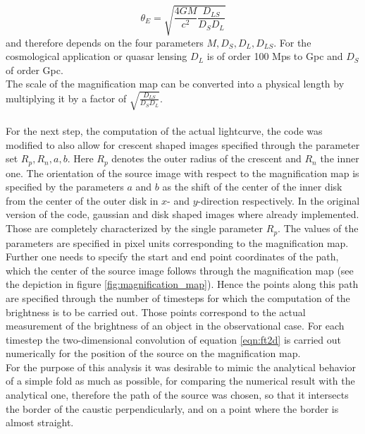 \begin{equation}
\theta_{E}=\sqrt{\frac{4GM}{c^{2}} \frac{D_{LS}}{D_{S}D_{L}}} 
\end{equation}  
and therefore depends on the four parameters $M,D_{S},D_{L},D_{LS}$. For the cosmological application or quasar lensing $D_{L}$ is of order 100 Mps to Gpc and $D_{S}$ of order Gpc.\\   
The scale of the magnification map can be converted into a physical length by multiplying it by a factor of $ \sqrt{\frac{D_{LS}}{D_{S}D_{L}}}$.\\\\
For the next step, the computation of the actual lightcurve, the code was modified to also allow for crescent shaped images specified through the parameter set $R_p,R_n,a,b$. Here $R_p$ denotes the outer radius of the crescent and $R_n$ the inner one. The orientation of the source image with respect to the magnification map is specified by the parameters $a$ and $b$ as the shift of the center of the inner disk from the center of the outer disk in $x$- and $y$-direction respectively. In the original version of the code, gaussian and disk shaped images where already implemented. Those are completely characterized by the single parameter $R_p$. The values of the parameters are specified in pixel units corresponding to the magnification map. Further one needs to specify the start and end point coordinates of the path, which the center of the source image follows through the magnification map (see the depiction in figure \ref{fig:magnification_map}). Hence the points along this path are specified through the number of timesteps for which the computation of the brightness is to be carried out. Those points correspond to the actual measurement of the brightness of an object in the observational case. For each timestep the two-dimensional convolution of equation \ref{eqn:ft2d} is carried out numerically for the position of the source on the magnification map. \\
For the purpose of this analysis it was desirable to mimic the analytical behavior of a simple fold as much as possible, for comparing the numerical result with the analytical one, therefore the path of the source was chosen, so that it intersects the border of the caustic perpendicularly, and on a point where the border is almost straight.  
